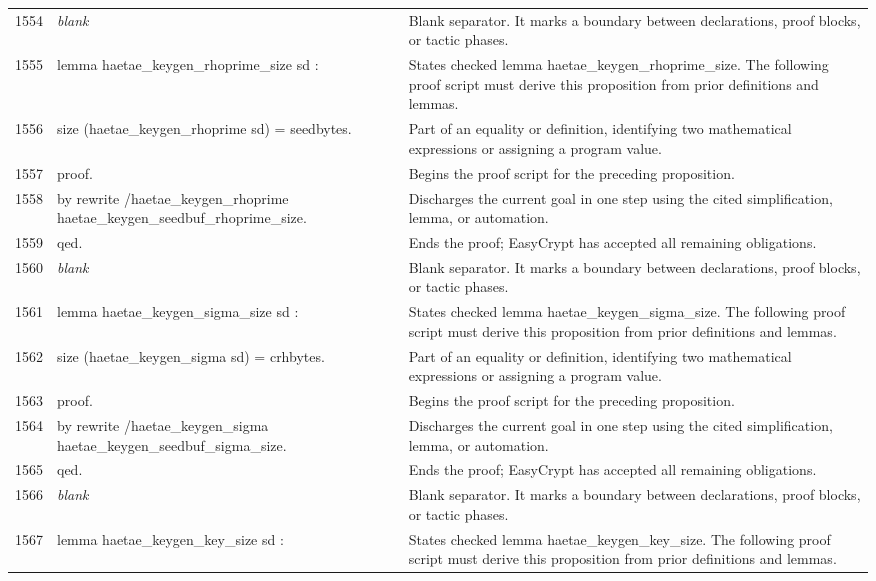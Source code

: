 \documentclass[10pt]{article}
\begin{document}
\begin{longtable}{r L{0.53\textwidth} L{0.37\textwidth}}
1554 & {\ttfamily\scriptsize \emph{blank}} & Blank separator.  It marks a boundary between declarations, proof blocks, or tactic phases. \\
1555 & {\ttfamily\scriptsize lemma haetae\_keygen\_rhoprime\_size sd :} & States checked lemma haetae\_keygen\_rhoprime\_size.  The following proof script must derive this proposition from prior definitions and lemmas. \\
1556 & {\ttfamily\scriptsize   size (haetae\_keygen\_rhoprime sd) = seedbytes.} & Part of an equality or definition, identifying two mathematical expressions or assigning a program value. \\
1557 & {\ttfamily\scriptsize proof.} & Begins the proof script for the preceding proposition. \\
1558 & {\ttfamily\scriptsize by rewrite /haetae\_keygen\_rhoprime haetae\_keygen\_seedbuf\_rhoprime\_size.} & Discharges the current goal in one step using the cited simplification, lemma, or automation. \\
1559 & {\ttfamily\scriptsize qed.} & Ends the proof; EasyCrypt has accepted all remaining obligations. \\
1560 & {\ttfamily\scriptsize \emph{blank}} & Blank separator.  It marks a boundary between declarations, proof blocks, or tactic phases. \\
1561 & {\ttfamily\scriptsize lemma haetae\_keygen\_sigma\_size sd :} & States checked lemma haetae\_keygen\_sigma\_size.  The following proof script must derive this proposition from prior definitions and lemmas. \\
1562 & {\ttfamily\scriptsize   size (haetae\_keygen\_sigma sd) = crhbytes.} & Part of an equality or definition, identifying two mathematical expressions or assigning a program value. \\
1563 & {\ttfamily\scriptsize proof.} & Begins the proof script for the preceding proposition. \\
1564 & {\ttfamily\scriptsize by rewrite /haetae\_keygen\_sigma haetae\_keygen\_seedbuf\_sigma\_size.} & Discharges the current goal in one step using the cited simplification, lemma, or automation. \\
1565 & {\ttfamily\scriptsize qed.} & Ends the proof; EasyCrypt has accepted all remaining obligations. \\
1566 & {\ttfamily\scriptsize \emph{blank}} & Blank separator.  It marks a boundary between declarations, proof blocks, or tactic phases. \\
1567 & {\ttfamily\scriptsize lemma haetae\_keygen\_key\_size sd :} & States checked lemma haetae\_keygen\_key\_size.  The following proof script must derive this proposition from prior definitions and lemmas. \\

\end{longtable}
\end{document}
